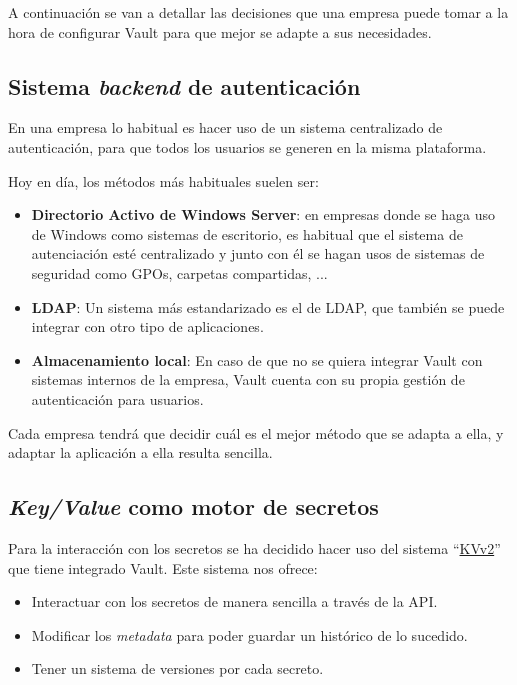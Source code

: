 \documentclass{\ClassPath/viu-tfm-template}
\begin{document}
A continuación se van a detallar las decisiones que una empresa puede tomar a la hora de configurar Vault para que mejor se adapte a sus necesidades.

\subsection{Sistema \textit{backend} de autenticación}

En una empresa lo habitual es hacer uso de un sistema centralizado de autenticación, para que todos los usuarios se generen en la misma plataforma.

Hoy en día, los métodos más habituales suelen ser:
\begin{itemize}
    \item \textbf{Directorio Activo de Windows Server}: en empresas donde se haga uso de Windows como sistemas de escritorio, es habitual que el sistema de autenciación esté centralizado y junto con él se hagan usos de sistemas de seguridad como GPOs, carpetas compartidas, ...
    \item \textbf{LDAP}: Un sistema más estandarizado es el de LDAP, que también se puede integrar con otro tipo de aplicaciones.

    \item \textbf{Almacenamiento local}: En caso de que no se quiera integrar Vault con sistemas internos de la empresa, Vault cuenta con su propia gestión de autenticación para usuarios.
\end{itemize}

Cada empresa tendrá que decidir cuál es el mejor método que se adapta a ella, y adaptar la aplicación a ella resulta sencilla.


\subsection{\textit{Key/Value} como motor de secretos}
Para la interacción con los secretos se ha decidido hacer uso del sistema “\href{https://developer.hashicorp.com/vault/api-docs/secret/kv/kv-v2}{KVv2}” que tiene integrado Vault. Este sistema nos ofrece:

\begin{itemize}
    \item Interactuar con los secretos de manera sencilla a través de la API.
    \item Modificar los \textit{metadata} para poder guardar un histórico de lo sucedido.
    \item Tener un sistema de versiones por cada secreto.
\end{itemize}
\end{document}
